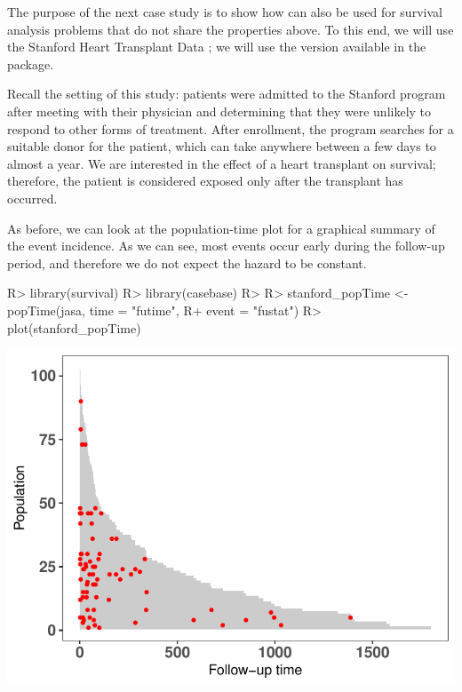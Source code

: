 \documentclass[
]{jss}
\begin{document}
The purpose of the next case study is to show how  can
also be used for survival analysis problems that do not share the
properties above. To this end, we will use the Stanford Heart Transplant
Data \citep[\citet{crowley1977covariance}]{clark1971cardiac}; we will
use the version available in the  package.

Recall the setting of this study: patients were admitted to the Stanford
program after meeting with their physician and determining that they
were unlikely to respond to other forms of treatment. After enrollment,
the program searches for a suitable donor for the patient, which can
take anywhere between a few days to almost a year. We are interested in
the effect of a heart transplant on survival; therefore, the patient is
considered exposed only after the transplant has occurred.

As before, we can look at the population-time plot for a graphical
summary of the event incidence. As we can see, most events occur early
during the follow-up period, and therefore we do not expect the hazard
to be constant.

\begin{CodeChunk}

\begin{CodeInput}
R> library(survival)
R> library(casebase)
R> 
R> stanford_popTime <- popTime(jasa, time = "futime", 
R+                             event = "fustat")
R> plot(stanford_popTime)
\end{CodeInput}


\begin{center}\includegraphics{../figures/stanford-poptime-1} \end{center}

\end{CodeChunk}
\end{document}
